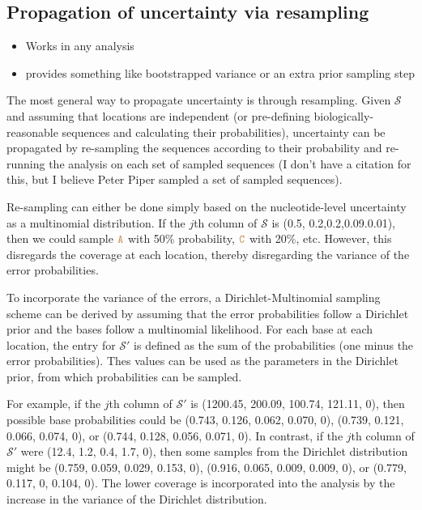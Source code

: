 \documentclass[
]{article}
\providecommand{\tightlist}{%
  \setlength{\itemsep}{0pt}\setlength{\parskip}{0pt}}
\newcommand{\sq}[1]{\texttt{\textcolor{brown}{#1}}}
\newcommand{\nps}{\mathcal{S}} %
\begin{document}
\hypertarget{propagation-of-uncertainty-via-resampling}{%
\subsection{Propagation of uncertainty via
resampling}\label{propagation-of-uncertainty-via-resampling}}

\begin{itemize}
\tightlist
\item
  Works in any analysis
\item
  provides something like bootstrapped variance or an extra prior
  sampling step
\end{itemize}

The most general way to propagate uncertainty is through resampling.
Given \(\nps\) and assuming that locations are independent (or
pre-defining biologically-reasonable sequences and calculating their
probabilities), uncertainty can be propagated by re-sampling the
sequences according to their probability and re-running the analysis on
each set of sampled sequences (I don't have a citation for this, but I
believe Peter Piper sampled a set of sampled sequences).

Re-sampling can either be done simply based on the nucleotide-level
uncertainty as a multinomial distribution. If the \(j\)th column of
\(\nps\) is (0.5, 0.2,0.2,0.09.0.01), then we could sample \(\sq{A}\)
with 50\% probability, \(\sq{C}\) with 20\%, etc. However, this
disregards the coverage at each location, thereby disregarding the
variance of the error probabilities.

To incorporate the variance of the errors, a Dirichlet-Multinomial
sampling scheme can be derived by assuming that the error probabilities
follow a Dirichlet prior and the bases follow a multinomial likelihood.
For each base at each location, the entry for \(\nps'\) is defined as
the sum of the probabilities (one minus the error probabilities). Thes
values can be used as the parameters in the Dirichlet prior, from which
probabilities can be sampled.

For example, if the \(j\)th column of \(\nps'\) is (1200.45, 200.09,
100.74, 121.11, 0), then possible base probabilities could be (0.743,
0.126, 0.062, 0.070, 0), (0.739, 0.121, 0.066, 0.074, 0), or (0.744,
0.128, 0.056, 0.071, 0). In contrast, if the \(j\)th column of \(\nps'\)
were (12.4, 1.2, 0.4, 1.7, 0), then some samples from the Dirichlet
distribution might be (0.759, 0.059, 0.029, 0.153, 0), (0.916, 0.065,
0.009, 0.009, 0), or (0.779, 0.117, 0, 0.104, 0). The lower coverage is
incorporated into the analysis by the increase in the variance of the
Dirichlet distribution.
\end{document}
